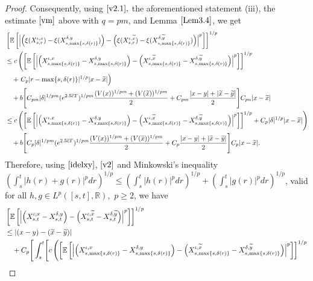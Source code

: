 \documentclass[11pt]{article}
\theoremstyle{theorem}
\theoremstyle{definition}
\newcommand{\1}{{\bf 1}}
\begin{document}
\begin{proof}
Consequently, using 
$\eqref{v2.1},$ the aforementioned statement (iii), the estimate $\eqref{vm}$ above with $q=pm$, and Lemma $\ref{Lem3.4}$, we get
\begin{align}
  \label{v2}
& \left[\mathbb{E}\left[\left|\left(\xi(X^{\iota, x}_{s,r})-\xi(X^{\delta,y}_{s,\max\{s, \delta(r)\}})\right) - \left(\xi(X^{\iota, \widetilde{x}}_{s,r})-\xi(X^{\delta, \widetilde{y}}_{s,\max\{s, \delta(r)\}})\right)\right|^p\right]\right]^{1/p} \notag\\
    & \leq c \left( \left[\mathbb{E}\left[\left|\left(X^{\iota, x}_{s,\max\{s, \delta(r)\}}-X^{\delta,y}_{s,\max\{s, \delta(r)\}}\right) - \left(X^{\iota, \widetilde{x}}_{s,\max\{s, \delta(r)\}}-X^{\delta, \widetilde{y}}_{s,\max\{s, \delta(r)\}}\right)\right|^p\right] \right]^{1/p} \right. \notag\\
   &\quad  + \left. C_p  |r-\max\{s, \delta(r)\}|^{1/p} |x-\widetilde{x}| \right) \notag\\
   & \quad +b \Biggl[ C_{pm} |\delta|^{1/pm} (e^{2.5\overline{c}T})^{1/pm} \frac{ (V(x))^{1/pm}+(V(\widetilde{x}))^{1/pm}}{2}  + C_{pm} \dfrac{|x-y|+ |\widetilde{x}-\widetilde{y}|}{2}  \Biggr] C_{pn} |x-\widetilde{x}|\notag\\
   & \leq c \left( \left[\mathbb{E}\left[\left|\left(X^{\iota, x}_{s,\max\{s, \delta(r)\}}-X^{\delta,y}_{s,\max\{s, \delta(r)\}}\right) - \left(X^{\iota, \widetilde{x}}_{s,\max\{s, \delta(r)\}}-X^{\delta, \widetilde{y}}_{s,\max\{s, \delta(r)\}}\right)\right|^p\right] \right]^{1/p} +  C_p  |\delta|^{1/p} |x-\widetilde{x}| \right) \notag\\
   & \quad +b \Biggl[ C_p |\delta|^{1/pm} (e^{2.5\overline{c}T})^{1/pm} \frac{ (V(x))^{1/pm}+(V(\widetilde{x}))^{1/pm}}{2}  + C_p \dfrac{|x-y|+ |\widetilde{x}-\widetilde{y}|}{2}  \Biggr] C_p |x-\widetilde{x}|.
\end{align}
Therefore, using $\eqref{idelxy}$, $\eqref{v2}$ and Minkowski's inequality  $(\int_s^t |h(r)+g(r)|^p dr)^{1/p} \leq (\int_s^t |h(r)|^p dr)^{1/p} + (\int_s^t |g(r)|^p dr)^{1/p}$, valid for all $h, g \in L^p([s, t], \mathbb{R}),$ $p \geq 2$, we have
\begin{align*}
&\left[\mathbb{E}\left[\left|\left(X^{\iota, x}_{s,t}-X^{\delta,y}_{s,t}\right) - \left(X^{\iota, \widetilde{x}}_{s,t}-X^{\delta, \widetilde{y}}_{s,t}\right)\right|^p\right]\right]^{1/p} \notag\\
 & \leq |(x-y)-(\widetilde{x}-\widetilde{y})|   \notag\\
 &\quad + C_p   \Biggr[ \int_s^t  \Biggr[  c \left( \left[\mathbb{E}\left[\left|\left(X^{\iota, x}_{s,  \max\{s, \delta(r)\}  }-X^{\delta,y}_{s,\max \{s, \delta(r)\}}\right) - \left(X^{\iota, \widetilde{x}}_{s, \max\{s, \delta(r)\}}-X^{\delta, \widetilde{y}}_{s,\max \{s, \delta(r)\}}\right)\right|^p\right]\right]^{1/p} \right. \notag\\

\end{align*}
\end{proof}
\end{document}
